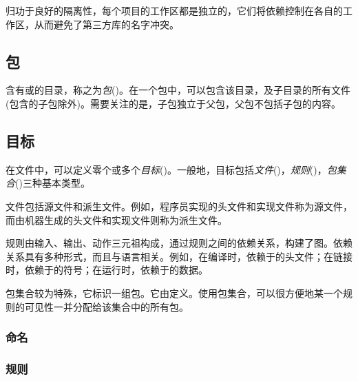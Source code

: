 \begin{content}
归功于良好的隔离性，每个项目的工作区都是独立的，它们将依赖控制在各自的工作区，从而避免了第三方库的名字冲突。

\subsection{包}

含有或的目录，称之为\emph{包}()。在一个包中，可以包含该目录，及子目录的所有文件(包含的子包除外)。需要关注的是，子包独立于父包，父包不包括子包的内容。

\subsection{目标}

在文件中，可以定义零个或多个\emph{目标}()。一般地，目标包括\emph{文件}()，\emph{规则}()，\emph{包集合}()三种基本类型。

文件包括源文件和派生文件。例如，程序员实现的\cpp{}头文件和实现文件称为源文件，而由机器生成的头文件和实现文件则称为派生文件。

规则由输入、输出、动作三元祖构成，通过规则之间的依赖关系，构建了图。依赖关系具有多种形式，而且与语言相关。例如，在编译时，依赖于的头文件；在链接时，依赖于的符号；在运行时，依赖于的数据。

包集合较为特殊，它标识一组包。它由定义。使用包集合，可以很方便地某一个规则的可见性一并分配给该集合中的所有包。

\subsubsection{命名}


\subsubsection{规则}



\end{content}
